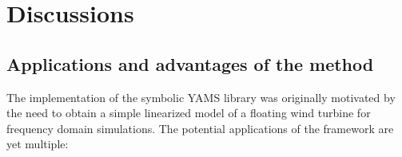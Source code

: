 \documentclass[wes, manuscript]{copernicus}
\begin{document}
\section{Discussions}


\subsection{Applications and advantages of the method}
\label{sec:Applications}
The implementation of the symbolic YAMS library was originally motivated by the need to obtain a simple linearized model of a floating wind turbine for frequency domain simulations.
The potential applications of the framework are yet multiple:
\end{document}
